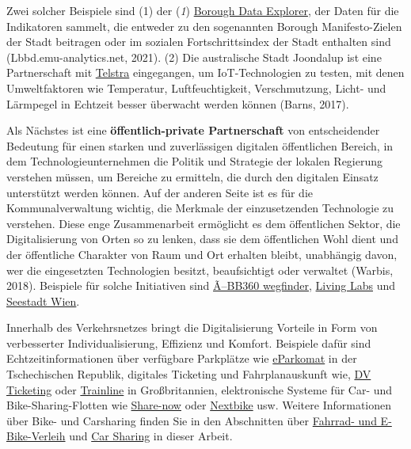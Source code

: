 \documentclass[
]{book}
\begin{document}
Zwei solcher Beispiele sind (1) der (\emph{1}) \href{https://lbbd.emu-analytics.net/main/(view/950db2c7-1a3b-448d-9b21-444a0ec7b5e0//rightBar:appinfo)?basemapDetail=1\&zoom=5.0\&lng=-0.36613\&lat=54.04187}{Borough Data Explorer}, der Daten für die Indikatoren sammelt, die entweder zu den sogenannten Borough Manifesto-Zielen der Stadt beitragen oder im sozialen Fortschrittsindex der Stadt enthalten sind (Lbbd.emu-analytics.net, 2021). (2) Die australische Stadt Joondalup ist eine Partnerschaft mit \href{https://www.lakesidejoondalup.com.au/store-directory/telstra-shop/}{Telstra} eingegangen, um IoT-Technologien zu testen, mit denen Umweltfaktoren wie Temperatur, Luftfeuchtigkeit, Verschmutzung, Licht- und Lärmpegel in Echtzeit besser überwacht werden können (Barns, 2017).

Als Nächstes ist eine \textbf{öffentlich-private Partnerschaft} von entscheidender Bedeutung für einen starken und zuverlässigen digitalen öffentlichen Bereich, in dem Technologieunternehmen die Politik und Strategie der lokalen Regierung verstehen müssen, um Bereiche zu ermitteln, die durch den digitalen Einsatz unterstützt werden können. Auf der anderen Seite ist es für die Kommunalverwaltung wichtig, die Merkmale der einzusetzenden Technologie zu verstehen. Diese enge Zusammenarbeit ermöglicht es dem öffentlichen Sektor, die Digitalisierung von Orten so zu lenken, dass sie dem öffentlichen Wohl dient und der öffentliche Charakter von Raum und Ort erhalten bleibt, unabhängig davon, wer die eingesetzten Technologien besitzt, beaufsichtigt oder verwaltet (Warbis, 2018). Beispiele für solche Initiativen sind \href{https://wegfinder.at/presse/2021/mit-wegfinder-ist-mobility-as-a-service-in-oesterreich-angekommen(1)/}{Ã--BB360 wegfinder}, \href{https://austriatech.at/en/insight-into-the-work-of-the-urban-mobility-laboratories/}{Living Labs} und \href{https://www.aspern-seestadt.at/en}{Seestadt Wien}.

Innerhalb des Verkehrsnetzes bringt die Digitalisierung Vorteile in Form von verbesserter Individualisierung, Effizienz und Komfort. Beispiele dafür sind Echtzeitinformationen über verfügbare Parkplätze wie \href{https://www.eparkomat.com/}{eParkomat} in der Tschechischen Republik, digitales Ticketing und Fahrplanauskunft wie, \href{https://www.dv-ticketing.com/}{DV Ticketing} oder \href{https://www.thetrainline.com/}{Trainline} in Großbritannien, elektronische Systeme für Car- und Bike-Sharing-Flotten wie \href{https://www.share-now.com/at/en/}{Share-now} oder \href{https://www.nextbike.at/de/niederoesterreich/}{Nextbike} usw. Weitere Informationen über Bike- und Carsharing finden Sie in den Abschnitten über \protect\hyperlink{bike_sharing}{Fahrrad- und E-Bike-Verleih} und \protect\hyperlink{car_sharing}{Car Sharing} in dieser Arbeit.
\end{document}
